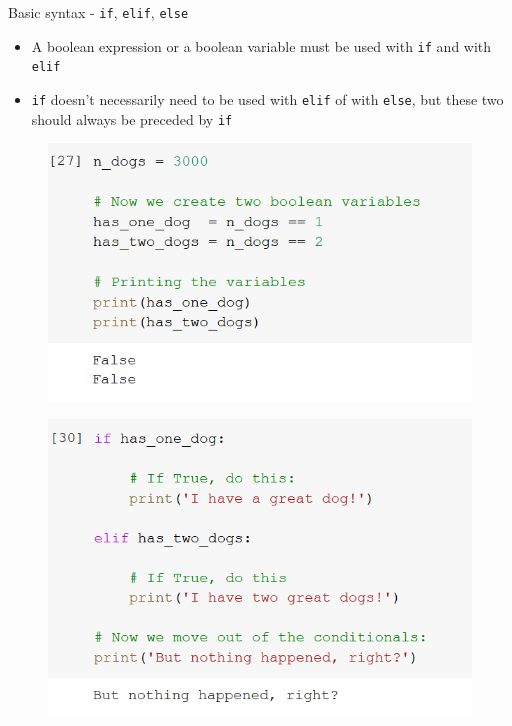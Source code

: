 \documentclass[aspectratio=169]{beamer}
\begin{document}
\begin{frame}{Basic syntax - \texttt{if}, \texttt{elif}, \texttt{else}}

	\begin{itemize}
		\item A boolean expression or a boolean variable must be used with \texttt{if} and with \texttt{elif}
		\item \texttt{if} doesn't necessarily need to be used with \texttt{elif} of with \texttt{else}, but these two should always be preceded by \texttt{if}
	\end{itemize}

	\begin{multicols}{2}

		\begin{figure}
			\centering
			\includegraphics[width=\linewidth]{img/boolean_variables.png}
		\end{figure}
		\begin{figure}
			\centering
			\includegraphics[width=\linewidth]{img/if_elif.png}
		\end{figure}

	\end{multicols}

\end{frame}
\end{document}
